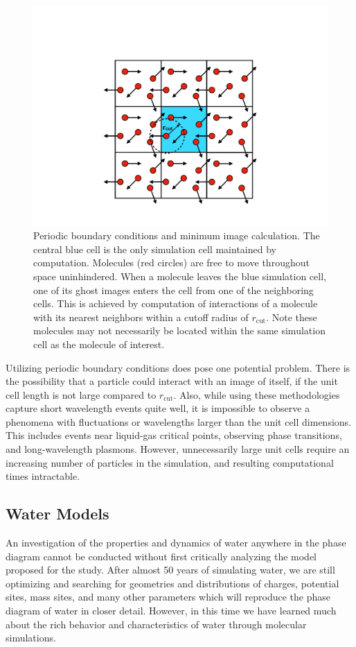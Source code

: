 \begin{figure}
\includegraphics[width=\linewidth]{Figures/PBC}
\caption{\label{fig:PBC} Periodic boundary conditions and minimum
  image calculation. The central blue cell is the only simulation cell
  maintained by computation. Molecules (red circles) are free to move
  throughout space uninhindered. When a molecule leaves the blue
  simulation cell, one of its ghost images enters the cell from one of
  the neighboring cells. This is achieved by computation of
  interactions of a molecule with its nearest neighbors within a
  cutoff radius of $r_{\mathrm{cut}}$. Note these molecules may not
  necessarily be located within the same simulation cell as the
  molecule of interest.}
\end{figure}

Utilizing periodic boundary conditions does pose one potential
problem. There is the possibility that a particle could interact with
an image of itself, if the unit cell length is not large compared to
$r_{\mathrm{cut}}$. Also, while using these methodologies capture
short wavelength events quite well, it is impossible to observe a
phenomena with fluctuations or wavelengths larger than the unit cell
dimensions. This includes events near liquid-gas critical points,
observing phase transitions, and long-wavelength plasmons. However,
unnecessarily large unit cells require an increasing number of
particles in the simulation, and resulting computational times
intractable.



\subsection{Water Models}\label{sec:WaterModels}
An investigation of the properties and dynamics of water anywhere in
the phase diagram cannot be conducted without first critically
analyzing the model proposed for the study. After almost 50 years of
simulating water, we are still optimizing and searching for geometries
and distributions of charges, potential sites, mass sites, and many
other parameters which will reproduce the phase diagram of water in
closer detail. However, in this time we have learned much about the
rich behavior and characteristics of water through molecular
simulations. 

